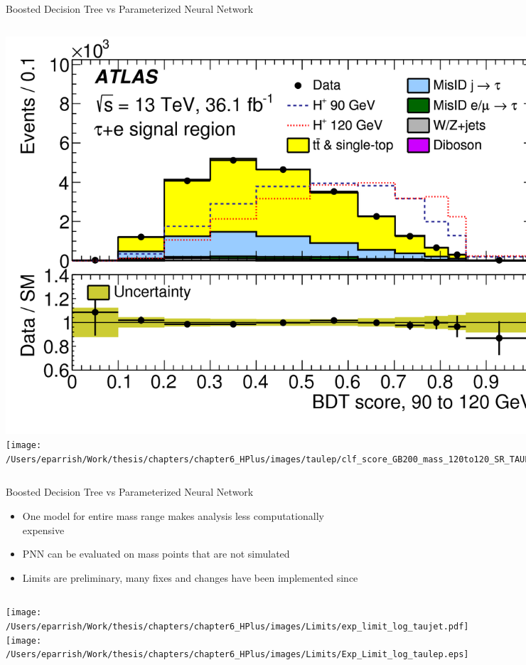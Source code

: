 \documentclass[aspectratio=169,xcolor=table]{beamer}
\begin{document}
      \begin{frame}[c]{Boosted Decision Tree vs Parameterized Neural Network}
        \begin{columns}[c]
          \includegraphics[height=.6\textheight,keepaspectratio=true]{tauel_SR_2018/tauel_SR_90to120_2018.png}
          \texttt{[image: /Users/eparrish/Work/thesis/chapters/chapter6\_HPlus/images/taulep/clf\_score\_GB200\_mass\_120to120\_SR\_TAUEL.png]}
        \end{columns}
      \end{frame}

    \begin{frame}[t]{Boosted Decision Tree vs Parameterized Neural Network}
      \begin{itemize}
        \item One model for entire mass range makes analysis less computationally expensive
        \item PNN can be evaluated on mass points that are not simulated
        \item Limits are preliminary, many fixes and changes have been implemented since
      \end{itemize}
      \begin{columns}
      \centering
      \texttt{[image: /Users/eparrish/Work/thesis/chapters/chapter6\_HPlus/images/Limits/exp\_limit\_log\_taujet.pdf]}
      \centering
      \texttt{[image: /Users/eparrish/Work/thesis/chapters/chapter6\_HPlus/images/Limits/Exp\_Limit\_log\_taulep.eps]}
      \end{columns}
    \end{frame}
\end{document}
